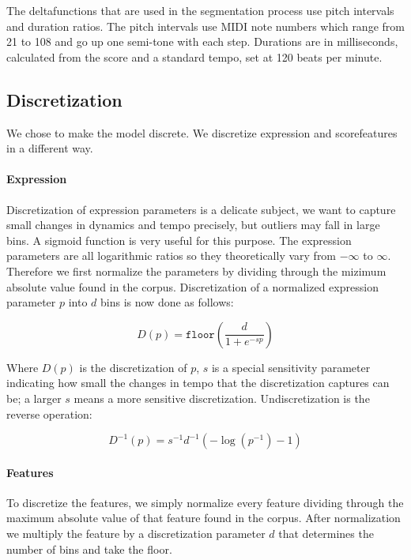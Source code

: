 \documentclass[a4paper,10pt]{article}
\begin{document}
The deltafunctions that are used in the segmentation process use pitch intervals and duration ratios. The pitch intervals use MIDI note numbers which range from 21 to 108 and go up one semi-tone with each step. Durations are in milliseconds, calculated from the score and a standard tempo, set at 120 beats per minute.

\subsection{Discretization}
\label{sec:discretization}

We chose to make the model discrete. We discretize expression and scorefeatures in a different way.

\paragraph*{Expression} Discretization of expression parameters is a delicate subject, we want to capture small changes in dynamics and tempo precisely, but outliers may fall in large bins. A sigmoid function is very useful for this purpose. The expression parameters are all logarithmic ratios so they theoretically vary from $-\infty$ to $\infty$. Therefore we first normalize the parameters by dividing through the mizimum absolute value found in the corpus. Discretization of a normalized expression parameter $p$ into $d$ bins is now done as follows:

\begin{equation}
D(p) = \texttt{floor}\left(\frac{d}{1+e^{-sp}}\right)
\end{equation}

Where $D(p)$ is the discretization of $p$, $s$ is a special sensitivity parameter indicating how small the changes in tempo that the discretization captures can be; a larger $s$ means a more sensitive discretization. Undiscretization is the reverse operation:

\begin{equation}
D^{-1}(p) = s^{-1} d^{-1}(-\log(p^{-1}) - 1)
\end{equation}

\paragraph*{Features}

To discretize the features, we simply normalize every feature dividing through the maximum absolute value of that feature found in the corpus. After normalization we multiply the feature by a discretization parameter $d$ that determines the number of bins and take the floor.
\end{document}
